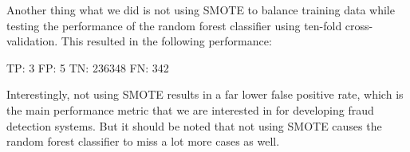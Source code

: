 \documentclass[]{article}
\begin{document}
Another thing what we did is not using SMOTE to balance training data while testing the performance of the random forest classifier using ten-fold cross-validation. This resulted in the following performance:
\begin{flushleft}
	TP: 3 \newline
	FP: 5  \newline
	TN: 236348 \newline
	FN: 342 \newline
\end{flushleft}
Interestingly, not using SMOTE results in a far lower false positive rate, which is the main performance metric that we are interested in for developing fraud detection systems. But it should be noted that not using SMOTE causes the random forest classifier to miss a lot more cases as well.
\clearpage


\end{document}
